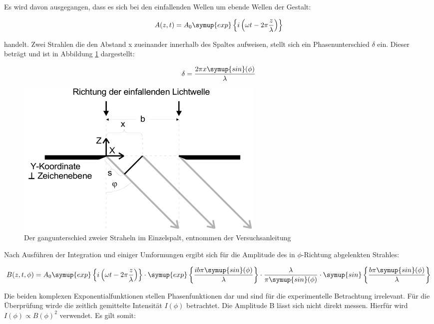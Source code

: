 Es wird davon ausgegangen, dass es sich bei den einfallenden Wellen um ebende Wellen der Gestalt:

\begin{equation}
  A(z,t) = A_0 \symup{exp}\left\{i \left(\omega t - 2\pi \frac{z}{\lambda} \right) \right\}
\end{equation}

handelt.
Zwei Strahlen die den Abstand x zueinander innerhalb des Spaltes aufweisen, stellt sich ein Phasenunterschied $\delta$ ein.
Dieser beträgt und ist in Abbildung \ref{fig:Phasenunterschied} dargestellt:

\begin{equation}
  \delta = \frac{2\pi x \symup{sin}(\phi)}{\lambda}
\end{equation}

\begin{figure}
  \centering
  \includegraphics[scale=0.7]{images/Phasenunterschied.png}
  \caption{Der gangunterschied zweier Straheln im Einzelspalt, entnommen der Versuchsanleitung \cite[32]{V406}}
  \label{fig:Phasenunterschied}
\end{figure}

Nach Ausführen der Integration und einiger Umformungen ergibt sich für die Amplitude des in $\phi$-Richtung abgelenkten Strahles:

\begin{equation}
  B(z, t, \phi) = A_0 \symup{exp}\left\{i \left(\omega t - 2\pi \frac{z}{\lambda} \right) \right\}
  \cdot \symup{exp}\left\{ \frac{i b \pi \symup{sin}(\phi)}{\lambda} \right\}
  \cdot \frac{\lambda}{\pi \symup{sin}(\phi)}
  \cdot \symup{sin} \left\{ \frac{b \pi \symup{sin}(\phi)}{\lambda} \right\}
\end{equation}

Die beiden komplexen Exponentialfunktionen stellen Phasenfunktionen dar und sind für die experimentelle Betrachtung irrelevant.
Für die Überprüfung wirde die zeitlich gemittelte Intensität $I(\phi)$ betrachtet.
Die Amplitude B lässt sich nicht direkt messen.
Hierfür wird $I(\phi) \propto B(\phi)^2$ verwendet.
Es gilt somit:

